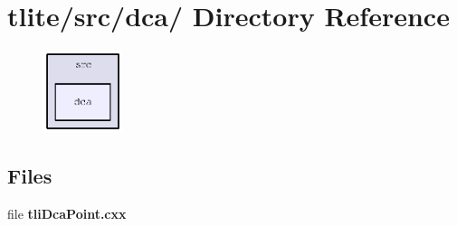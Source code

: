 \section{tlite/src/dca/ Directory Reference}
\label{dir_a260e68bbf6e2c2920df76e692448e7d}


\begin{figure}[H]
\begin{center}
\leavevmode
\includegraphics[width=65pt]{dir_a260e68bbf6e2c2920df76e692448e7d_dep}
\end{center}
\end{figure}
\subsection*{Files}
\begin{CompactItemize}
\item 
file \textbf{tli\-Dca\-Point.cxx}
\end{CompactItemize}
